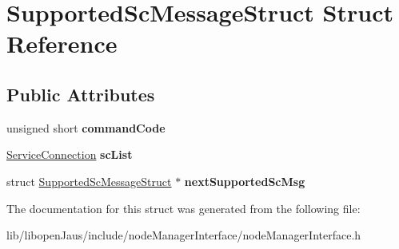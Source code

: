 \hypertarget{struct_supported_sc_message_struct}{\section{\-Supported\-Sc\-Message\-Struct \-Struct \-Reference}
\label{struct_supported_sc_message_struct}
}
\subsection*{\-Public \-Attributes}
\begin{DoxyCompactItemize}
\item 
\hypertarget{struct_supported_sc_message_struct_ad25b4ac777de1ca664964974e1fca22c}{unsigned short {\bfseries command\-Code}}\label{struct_supported_sc_message_struct_ad25b4ac777de1ca664964974e1fca22c}

\item 
\hypertarget{struct_supported_sc_message_struct_a69a74474f2bf134589f6a55d80bc4131}{\hyperlink{struct_service_connection_struct}{\-Service\-Connection} {\bfseries sc\-List}}\label{struct_supported_sc_message_struct_a69a74474f2bf134589f6a55d80bc4131}

\item 
\hypertarget{struct_supported_sc_message_struct_a7955be897facd90dd8402500ef7ad2ab}{struct \hyperlink{struct_supported_sc_message_struct}{\-Supported\-Sc\-Message\-Struct} $\ast$ {\bfseries next\-Supported\-Sc\-Msg}}\label{struct_supported_sc_message_struct_a7955be897facd90dd8402500ef7ad2ab}

\end{DoxyCompactItemize}


\-The documentation for this struct was generated from the following file\-:\begin{DoxyCompactItemize}
\item 
lib/libopen\-Jaus/include/node\-Manager\-Interface/node\-Manager\-Interface.\-h\end{DoxyCompactItemize}
